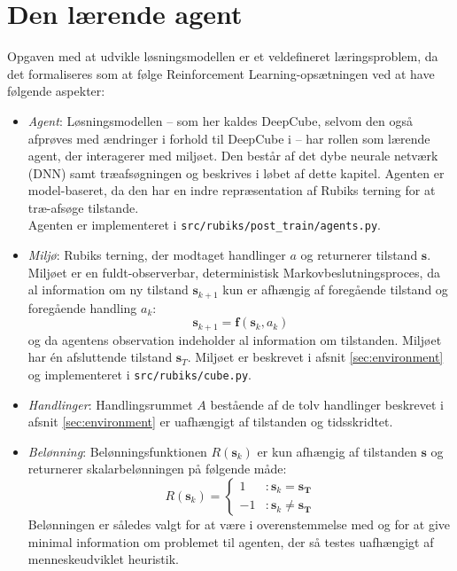 \documentclass[../main.tex]{subfiles}
\begin{document}
\section{Den lærende agent}\label{sec:learnADI}
Opgaven med at udvikle løsningsmodellen er et veldefineret læringsproblem, da det formaliseres som at følge Reinforcement Learning-opsætningen ved at have følgende aspekter:
\begin{itemize}
	\item \textit{Agent}:
	Løsningsmodellen -- som her kaldes DeepCube, selvom den også afprøves med ændringer i forhold til DeepCube i \cite{HumansBeGone} -- har rollen som lærende agent, der interagerer med miljøet.
	Den består af det dybe neurale netværk (DNN) samt træafsøgningen og beskrives i løbet af dette kapitel.
	Agenten er model-baseret, da den har en indre repræsentation af Rubiks terning for at træ-afsøge tilstande.\\
	Agenten er implementeret i  \texttt{src/rubiks/post\_train/agents.py}.
	\item \textit{Miljø}:
	Rubiks terning, der modtaget handlinger \(a\) og returnerer tilstand \(\mathbf s\).
	Miljøet er en fuldt-observerbar, deterministisk Markovbeslutningsproces, da al information om ny tilstand \(\mathbf s_{k+1}\) kun er afhængig af foregående tilstand og foregående handling \(a_k\):
	\[
		\mathbf s _ {k+1} = \mathbf f(\mathbf s _k, a_k)
	\] 
	og da agentens observation indeholder al information om tilstanden.
	Miljøet har én afsluttende tilstand \(\mathbf s_T\).
	Miljøet er  beskrevet i afsnit \ref{sec:environment} og implementeret i \texttt{src/rubiks/cube.py}.
	\item  \textit{Handlinger}:
	Handlingsrummet \(A\) bestående af de tolv handlinger beskrevet i afsnit \ref{sec:environment} er uafhængigt af tilstanden og tidsskridtet.
	\item \textit{Belønning}:
	Belønningsfunktionen \( R(\mathbf s_k)\) er kun afhængig af tilstanden \(\mathbf s\) og returnerer skalarbelønningen på følgende måde:
	\[
		R (\mathbf s_k) = 
		\begin{cases}
			1  &: \mathbf s_k = \mathbf{s_T}\\
			-1 &: \mathbf s_k \neq \mathbf{s_T}
		\end{cases}
	\] 
	Belønningen er således valgt for at være i overenstemmelse med \cite{HumansBeGone} og for at give minimal information om problemet til agenten, der så testes uafhængigt af menneskeudviklet heuristik.
\end{itemize}
\end{document}
